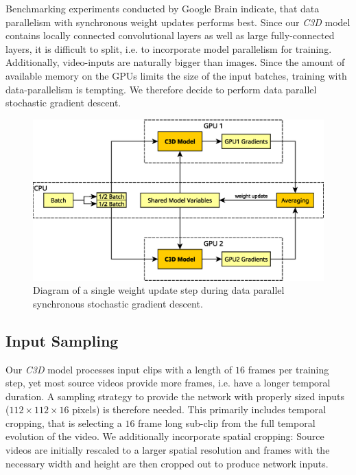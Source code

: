 Benchmarking experiments conducted by Google Brain \cite{chen_revisiting_2016} indicate, that data parallelism with synchronous weight updates performs best.
Since our \textit{C3D} model contains locally connected convolutional layers as well as large fully-connected layers, it is difficult to split, i.e. to incorporate model parallelism for training.
Additionally, video-inputs are naturally bigger than images.
Since the amount of available memory on the GPUs limits the size of the input batches, training with data-parallelism is tempting.
We therefore decide to perform data parallel stochastic gradient descent.

\begin{figure}[H]
    \centering
    \includegraphics[width=\textwidth]{img_approach/gradient_averaging.eps}
    \caption{Diagram of a single weight update step during data parallel synchronous stochastic gradient descent.}
    \label{fig:gradient_averaging}
\end{figure}


\subsection{Input Sampling}
Our \textit{C3D} model processes input clips with a length of $16$ frames per training step, yet most source videos provide more frames, i.e. have a longer temporal duration.
A sampling strategy to provide the network with properly sized inputs ($112 \times 112 \times 16$ pixels) is therefore needed.
This primarily includes temporal cropping, that is selecting a $16$ frame long sub-clip from the full temporal evolution of the video.
We additionally incorporate spatial cropping: Source videos are initially rescaled to a larger spatial resolution and frames with the necessary width and height are then cropped out to produce network inputs.

